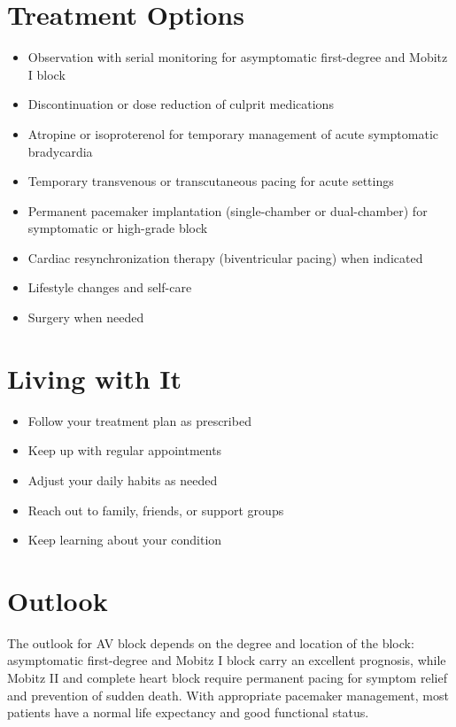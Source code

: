 \section{Treatment Options}

\begin{itemize}[noitemsep]
  \item Observation with serial monitoring for asymptomatic first-degree and Mobitz I block
  \item Discontinuation or dose reduction of culprit medications
  \item Atropine or isoproterenol for temporary management of acute symptomatic bradycardia
  \item Temporary transvenous or transcutaneous pacing for acute settings
  \item Permanent pacemaker implantation (single-chamber or dual-chamber) for symptomatic or high-grade block
  \item Cardiac resynchronization therapy (biventricular pacing) when indicated
  \item Lifestyle changes and self-care
  \item Surgery when needed
\end{itemize}

\section{Living with It}

\begin{itemize}[noitemsep]
  \item Follow your treatment plan as prescribed
  \item Keep up with regular appointments
  \item Adjust your daily habits as needed
  \item Reach out to family, friends, or support groups
  \item Keep learning about your condition
\end{itemize}

\section{Outlook}
The outlook for AV block depends on the degree and location of the block: asymptomatic first-degree and Mobitz I block carry an excellent prognosis, while Mobitz II and complete heart block require permanent pacing for symptom relief and prevention of sudden death. With appropriate pacemaker management, most patients have a normal life expectancy and good functional status.
